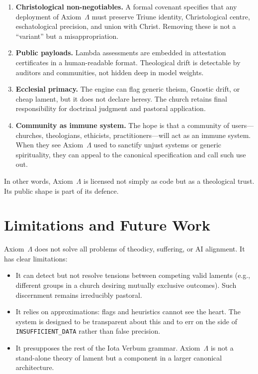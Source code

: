 \documentclass[11pt]{article}
\begin{document}
\begin{enumerate}[label=(\arabic*)]
  \item \textbf{Christological non-negotiables.} A formal covenant specifies that any deployment of Axiom~$\Lambda$ must preserve Triune identity, Christological centre, eschatological precision, and union with Christ. Removing these is not a ``variant'' but a misappropriation.
  \item \textbf{Public payloads.} Lambda assessments are embedded in attestation certificates in a human-readable format. Theological drift is detectable by auditors and communities, not hidden deep in model weights.
  \item \textbf{Ecclesial primacy.} The engine can flag generic theism, Gnostic drift, or cheap lament, but it does not declare heresy. The church retains final responsibility for doctrinal judgment and pastoral application.
  \item \textbf{Community as immune system.} The hope is that a community of users---churches, theologians, ethicists, practitioners---will act as an immune system. When they see Axiom~$\Lambda$ used to sanctify unjust systems or generic spirituality, they can appeal to the canonical specification and call such use out.
\end{enumerate}

In other words, Axiom~$\Lambda$ is licensed not simply as code but as a theological trust. Its public shape is part of its defence.

\section{Limitations and Future Work}

Axiom~$\Lambda$ does not solve all problems of theodicy, suffering, or AI alignment. It has clear limitations:

\begin{itemize}
  \item It can detect but not resolve tensions between competing valid laments (e.g., different groups in a church desiring mutually exclusive outcomes). Such discernment remains irreducibly pastoral.
  \item It relies on approximations: flags and heuristics cannot see the heart. The system is designed to be transparent about this and to err on the side of \texttt{INSUFFICIENT\_DATA} rather than false precision.
  \item It presupposes the rest of the Iota Verbum grammar. Axiom~$\Lambda$ is not a stand-alone theory of lament but a component in a larger canonical architecture.
\end{itemize}
\end{document}

